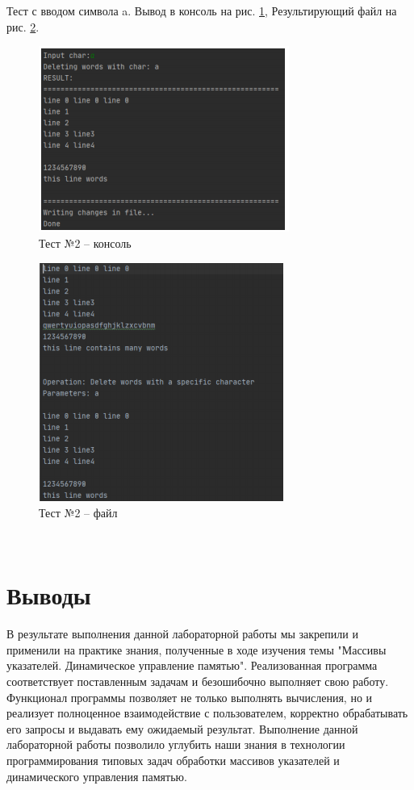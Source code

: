\documentclass[12pt,a4paper]{article}  %
\begin{document}
	\newpage

	Тест с вводом символа a. Вывод в консоль на рис. \ref{test.2.console}, Результирующий
	файл на рис. \ref{test.2.file}.
	
	\begin{figure}[H]
		\centering
		\includegraphics[width=0.6\linewidth]{photo/test.2.console}
		\caption{Тест №2 -- консоль}
		\label{test.2.console}
	\end{figure}
	
	\begin{figure}[H]
		\centering
		\includegraphics[width=0.6\linewidth]{photo/test.2.file}
		\caption{Тест №2 -- файл}
		\label{test.2.file}
	\end{figure}

	\ \\

	\newpage
	
	\section*{Выводы}

	В результате выполнения данной лабораторной работы мы закрепили и применили на практике знания,
	полученные в ходе изучения темы
	"Массивы указателей.
	Динамическое управление памятью".
	Реализованная программа соответствует поставленным задачам и безошибочно выполняет свою работу.
	Функционал программы позволяет не только выполнять вычисления, но и реализует полноценное взаимодействие
	с пользователем, корректно обрабатывать его запросы и выдавать ему
	ожидаемый результат.
	Выполнение данной лабораторной работы позволило углубить наши знания в технологии программирования типовых
	задач обработки массивов указателей и динамического управления памятью.
	
\end{document}
